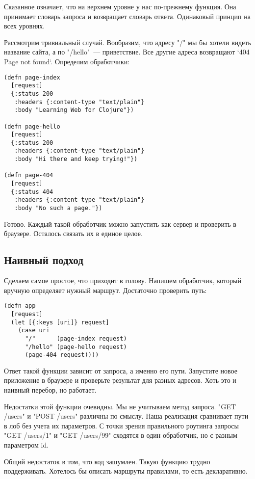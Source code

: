 Сказанное означает, что на верхнем уровне у нас по-прежнему функция. Она
принимает словарь запроса и возвращает словарь ответа. Одинаковый принцип на
всех уровнях.

Рассмотрим тривиальный случай. Вообразим, что адресу "/" мы бы хотели видеть
название сайта, а по "/hello"~--- приветствие. Все другие адреса возвращают `404
Page not found`. Определим обработчики:

\begin{verbatim}
(defn page-index
  [request]
  {:status 200
   :headers {:content-type "text/plain"}
   :body "Learning Web for Clojure"})

(defn page-hello
  [request]
  {:status 200
   :headers {:content-type "text/plain"}
   :body "Hi there and keep trying!"})

(defn page-404
  [request]
  {:status 404
   :headers {:content-type "text/plain"}
   :body "No such a page."})
\end{verbatim}

Готово. Каждый такой обработчик можно запустить как сервер и проверить в
браузере. Осталось связать их в единое целое.

\subsection{Наивный подход}

Сделаем самое простое, что приходит в голову. Напишем обработчик, который
вручную определяет нужный маршрут. Достаточно проверить путь:

\begin{verbatim}
(defn app
  [request]
  (let [{:keys [uri]} request]
    (case uri
      "/"      (page-index request)
      "/hello" (page-hello request)
      (page-404 request))))
\end{verbatim}

Ответ такой функции зависит от запроса, а именно его пути. Запустите новое
приложение в браузере и проверьте результат для разных адресов. Хоть это и
наивный перебор, но работает.

Недостатки этой функции очевидны. Мы не учитываем метод запроса. "GET /users" и
"POST /users" различны по смыслу. Наша реализация сравнивает пути в лоб без
учета их параметров. С точки зрения правильного роутинга запросы "GET /users/1"
и "GET /users/99" сходятся в один обработчик, но с разным параметром id.

Общий недостаток в том, что код зашумлен. Такую функцию трудно
поддерживать. Хотелось бы описать маршруты правилами, то есть декларативно.

